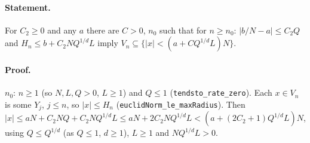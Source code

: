 \paragraph{Statement.} For $C_2\geq0$ and any $a$ there are $C>0$, $n_0$ such that for $n\geq n_0$: $|b/N-a|\leq C_2Q$ and $H_n\leq b+C_2NQ^{1/d}L$ imply
$V_n\subseteq\{|x|<(a+CQ^{1/d}L)N\}$.
\paragraph{Proof.} $n_0$: $n\geq1$ (so $N,L,Q>0$, $L\geq1$) and $Q\leq1$ (\texttt{tendsto\_rate\_zero}). Each $x\in V_n$ is some $Y_j$, $j\leq n$, so $|x|\leq H_n$ (\texttt{euclidNorm\_le\_maxRadius}).
Then $|x|\leq aN+C_2NQ+C_2NQ^{1/d}L\leq aN+2C_2NQ^{1/d}L<(a+(2C_2+1)Q^{1/d}L)N$, using $Q\leq Q^{1/d}$ (as $Q\leq1$, $d\geq1$), $L\geq1$ and $NQ^{1/d}L>0$.
